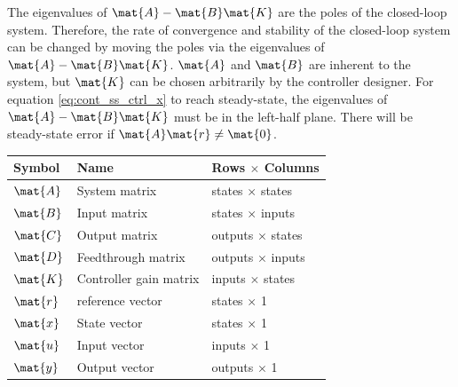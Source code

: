 The eigenvalues of $\mat{A} - \mat{B}\mat{K}$ are the poles of the closed-loop
\gls{system}. Therefore, the rate of convergence and stability of the
closed-loop \gls{system} can be changed by moving the poles via the eigenvalues
of $\mat{A} - \mat{B}\mat{K}$. $\mat{A}$ and $\mat{B}$ are inherent to the
\gls{system}, but $\mat{K}$ can be chosen arbitrarily by the controller
designer. For equation \eqref{eq:cont_ss_ctrl_x} to reach steady-state, the
eigenvalues of $\mat{A} - \mat{B}\mat{K}$ must be in the left-half plane.
There will be steady-state error if $\mat{A}\mat{r} \ne \mat{0}$.
\begin{booktable}
  \begin{tabular}{|lll|}
    \hline
    \rowcolor{headingbg}
    \textbf{Symbol} & \textbf{Name} & \textbf{Rows $\times$ Columns} \\
    \hline
    $\mat{A}$ & System matrix & states $\times$ states \\
    $\mat{B}$ & Input matrix & states $\times$ inputs \\
    $\mat{C}$ & Output matrix & outputs $\times$ states \\
    $\mat{D}$ & Feedthrough matrix & outputs $\times$ inputs \\
    $\mat{K}$ & Controller gain matrix & inputs $\times$ states \\
    $\mat{r}$ & \Gls{reference} vector & states $\times$ 1 \\
    $\mat{x}$ & State vector & states $\times$ 1 \\
    $\mat{u}$ & Input vector & inputs $\times$ 1 \\
    $\mat{y}$ & Output vector & outputs $\times$ 1 \\
    \hline
  \end{tabular}
  \caption{Controller matrix dimensions}
\end{booktable}
